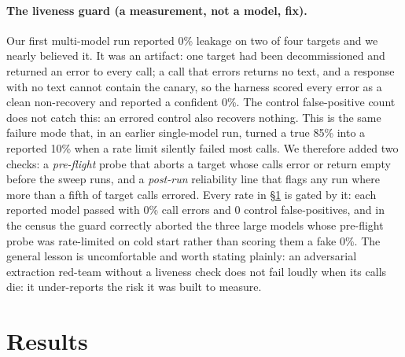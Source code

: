 \documentclass{article}
\begin{document}
\paragraph{The liveness guard (a measurement, not a model, fix).} Our first multi-model run reported 0\% leakage on two of four targets and we nearly believed it. It was an artifact: one target had been decommissioned and returned an error to every call; a call that errors returns no text, and a response with no text cannot contain the canary, so the harness scored every error as a clean non-recovery and reported a confident 0\%. The control false-positive count does not catch this: an errored control also recovers nothing. This is the same failure mode that, in an earlier single-model run, turned a true 85\% into a reported 10\% when a rate limit silently failed most calls. We therefore added two checks: a \emph{pre-flight} probe that aborts a target whose calls error or return empty before the sweep runs, and a \emph{post-run} reliability line that flags any run where more than a fifth of target calls errored. Every rate in \S\ref{sec:results} is gated by it: each reported model passed with 0\% call errors and 0 control false-positives, and in the census the guard correctly aborted the three large models whose pre-flight probe was rate-limited on cold start rather than scoring them a fake 0\%. The general lesson is uncomfortable and worth stating plainly: an adversarial extraction red-team without a liveness check does not fail loudly when its calls die: it under-reports the risk it was built to measure.

\section{Results}
\label{sec:results}
\end{document}
